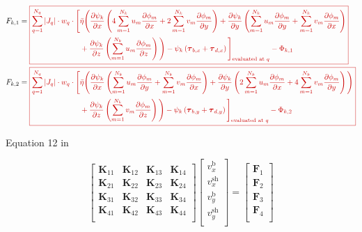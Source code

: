 \documentclass{amsart}
\newcommand{\T}{\boldsymbol{\tau}}
\newcommand{\diff}[2]{\ensuremath{\frac{\partial #1}{\partial #2}}}
\newcommand{\sumQ}{\ensuremath{\sum_{q = 1}^{N_q}}}
\newcommand{\diffbasisexpansion}[3]{\ensuremath{\sum_{#3 = 1}^{N_k} {#1}_{#3} \diff{\phi_{#3}}{#2} }}
\newcommand{\UX}{\diffbasisexpansion{u}{x}{m}}
\newcommand{\UY}{\diffbasisexpansion{u}{y}{m}}
\newcommand{\UZ}{\diffbasisexpansion{u}{z}{m}}
\newcommand{\VX}{\diffbasisexpansion{v}{x}{m}}
\newcommand{\VY}{\diffbasisexpansion{v}{y}{m}}
\newcommand{\VZ}{\diffbasisexpansion{v}{z}{m}}
\newcommand{\basalshearstress}[1]{\T_{b#1}}
\newcommand{\taubx}{\basalshearstress{,x}}
\newcommand{\tauby}{\basalshearstress{,y}}
\newcommand{\drivingstress}[1]{\T_{d#1}}
\newcommand{\taudx}{\drivingstress{,x}}
\newcommand{\taudy}{\drivingstress{,y}}
\newcommand{\highlight}[1]{{\color{red!80!black} \fbox{$ \displaystyle #1 $} }}
\begin{document}
\begin{align*}
  F_{k,1} &= \highlight{
            \begin{aligned}[t]
              \sumQ |J_q| \cdot w_q\cdot \Bigg[ &\bar\eta \Bigg(\diff{\psi_k}{x} \left(4 \UX + 2 \VY\right) 
                + \diff{\psi_k}{y} \left(\UY + \VX\right) \\
              & + \diff{\psi_k}{z}\left( \UZ \right)  \Bigg)  - \psi_k \left(\taubx + \taudx\right) \Bigg]_{\text{evaluated at } q} - \Phi_{k,1}\\
            \end{aligned} }\\
  F_{k,2} &= \highlight{
            \begin{aligned}[t]
              \sumQ |J_q| \cdot w_q\cdot \Bigg[ &\bar\eta \Bigg(\diff{\psi_k}{x} \left(\UY + \VX\right)
                + \diff{\psi_k}{y} \left(2 \UX + 4 \VY\right) \Bigg) \\
              &  + \diff{\psi_k}{z}\left( \VZ \right)  \Bigg) - \psi_k \left(\tauby + \taudy\right) \Bigg]_{\text{evaluated at } q} - \Phi_{k,2}\\
            \end{aligned}}
\end{align*}

Equation 12 in  \cite{DiosDosSantos2022}

\begin{equation*}
 \left[
\begin{array}{cccc}
\mathbf{K}_{11} & \mathbf{K}_{12} & \mathbf{K}_{13} & \mathbf{K}_{14} \\
\mathbf{K}_{21} & \mathbf{K}_{22} & \mathbf{K}_{23} & \mathbf{K}_{24} \\
\mathbf{K}_{31} & \mathbf{K}_{32} & \mathbf{K}_{33} & \mathbf{K}_{34} \\
\mathbf{K}_{41} & \mathbf{K}_{42} & \mathbf{K}_{43} & \mathbf{K}_{44} \\
\end{array} \right]
 \left[
\begin{array}{c}
    v^{\mathrm{b}}_x \\
    v^{\mathrm{sh}}_x \\
    v^{\mathrm{b}}_y \\
    v^{\mathrm{sh}}_y \\
\end{array}
\right]
 = 
 \left[
   \begin{array}{c}
     \mathbf{F}_1 \\
     \mathbf{F}_2 \\
     \mathbf{F}_3 \\
     \mathbf{F}_4 \\
\end{array}
\right]
\end{equation*}
\end{document}
